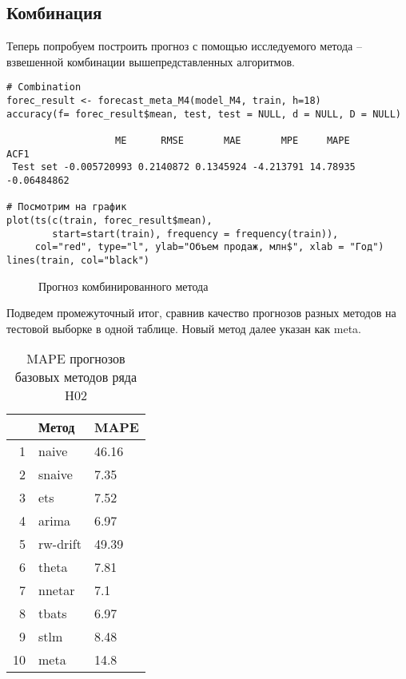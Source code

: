 \documentclass[a4paper,12pt]{article}
\theoremstyle{plain} %
\theoremstyle{definition} %
\theoremstyle{remark} %
\begin{document}
\subsection{Комбинация}

Теперь попробуем построить прогноз с помощью исследуемого метода -- взвешенной комбинации вышепредставленных алгоритмов.

\begin{verbatim}
# Combination
forec_result <- forecast_meta_M4(model_M4, train, h=18)
accuracy(f= forec_result$mean, test, test = NULL, d = NULL, D = NULL)

                   ME      RMSE       MAE       MPE     MAPE        ACF1
 Test set -0.005720993 0.2140872 0.1345924 -4.213791 14.78935 -0.06484862

# Посмотрим на график
plot(ts(c(train, forec_result$mean),
        start=start(train), frequency = frequency(train)),
     col="red", type="l", ylab="Объем продаж, млн$", xlab = "Год")
lines(train, col="black")
\end{verbatim}

\begin{figure}[H]
  \noindent{}
  \caption{Прогноз комбинированного метода}
\end{figure}

Подведем промежуточный итог, сравнив качество прогнозов разных методов на тестовой выборке в одной таблице. Новый метод далее указан как meta.

\begin{table}[ht]
\centering
\begin{tabular}{rll}
  \hline
 & Метод & MAPE \\
  \hline
1 & naive & 46.16 \\
  2 & snaive & 7.35 \\
  3 & ets & 7.52 \\
  4 & arima & 6.97\\
  5 & rw-drift & 49.39 \\
  6 & theta & 7.81 \\
  7 & nnetar & 7.1 \\
  8 & tbats & 6.97 \\
  9 & stlm & 8.48 \\
  10 & meta & 14.8 \\
   \hline
\end{tabular}
\caption{MAPE прогнозов базовых методов ряда H02}
\end{table}
\end{document}
